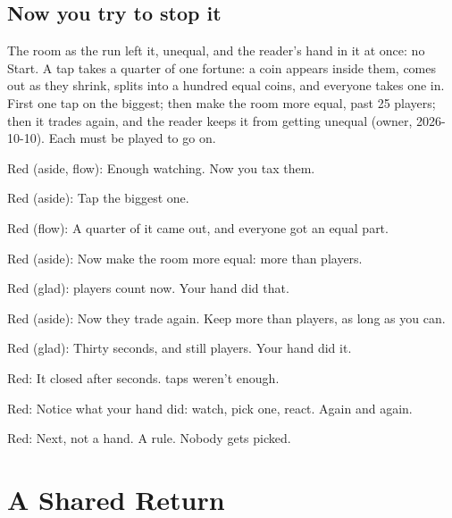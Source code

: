 \subsection{Now you try to stop it}\label{act:stop}

\label{stop}

The room as the run left it, unequal, and the reader's hand in it at once:
no Start. A tap takes a quarter of one fortune: a coin appears inside them,
comes out as they shrink, splits into a hundred equal coins, and everyone
takes one in. First one tap on the biggest; then make the room more equal, past 25 players; then
it trades again, and the reader keeps it from getting unequal (owner,
2026-10-10). Each must be played to go on.


Red (aside, flow): Enough watching.
Now you tax them.

Red (aside): Tap the biggest one.

Red (flow): A quarter of it came out,
and everyone got an equal part.

\label{stop-still}

Red (aside): Now make the room more equal:
more than  players.

Red (glad):  players count now.
Your hand did that.

\label{stop-live}

Red (aside): Now they trade again.
Keep more than  players, as long as you can.

Red (glad): Thirty seconds, and still  players.
Your hand did it.

Red: It closed after  seconds.
 taps weren't enough.

Red: Notice what your hand did:
watch, pick one, react. Again and again.

Red: Next, not a hand. A rule.
Nobody gets picked.

\section{A Shared Return}\label{index:even-fairer-game}

